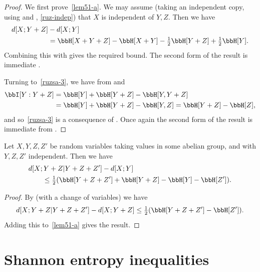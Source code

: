   \begin{proof}
    \leanok
  We first prove~\eqref{lem51-a}. We may assume (taking an independent copy, using  and , \ref{ruz-indep}) that $X$ is independent of $Y, Z$. Then we have
  \begin{align*}  d[X ;Y+ Z] & - d[X ;Y] \\ & = \bbH[X + Y + Z] - \bbH[X + Y] - \tfrac{1}{2}\bbH[Y + Z] + \tfrac{1}{2} \bbH[Y].\end{align*}
  Combining this with  gives the required bound. The second form of the result is immediate .

  Turning to~\eqref{ruzsa-3}, we have from  and 
  \begin{align*}  \bbI[Y : Y+ Z] & = \bbH[Y] + \bbH[Y + Z] - \bbH[Y, Y + Z] \\ & = \bbH[Y] + \bbH[Y + Z] - \bbH[Y, Z]  = \bbH[Y + Z] - \bbH[Z],\end{align*}
  and so~\eqref{ruzsa-3} is a consequence of . Once again the second form of the result is immediate from .
\end{proof}

\begin{lemma}\label{second-useful}
  \leanok
  Let $X, Y, Z, Z'$ be random variables taking values in some abelian group, and with $Y, Z, Z'$ independent. Then we have
  \begin{align}\nonumber
  & d[X ;Y + Z | Y + Z + Z'] - d[X ;Y] \\ & \qquad \leq \tfrac{1}{2} ( \bbH[Y + Z + Z'] + \bbH[Y + Z] - \bbH[Y] - \bbH[Z']).\label{7111}
  \end{align}
  \end{lemma}

  \begin{proof}
    \leanok
  By  (with a change of variables) we have
  \[d[X ; Y + Z | Y + Z + Z'] - d[X ; Y + Z] \leq \tfrac{1}{2}( \bbH[Y + Z + Z'] - \bbH[Z']).\]
  Adding this to~\eqref{lem51-a} gives the result.
  \end{proof}


\chapter{Shannon entropy inequalities}

